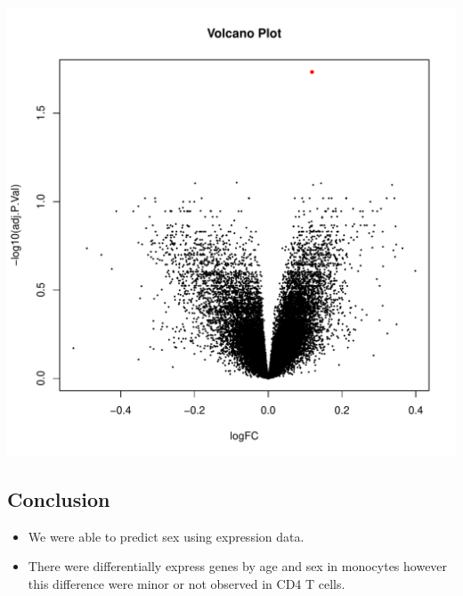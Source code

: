 \documentclass[]{article}
\providecommand{\tightlist}{%
  \setlength{\itemsep}{0pt}\setlength{\parskip}{0pt}}
\begin{document}
\includegraphics{./Vplot.Mod3_Mono_ageCategorical_sex.pdf}

\hypertarget{conclusion}{%
\subsection{Conclusion}\label{conclusion}}

\begin{itemize}
\tightlist
\item
  We were able to predict sex using expression data.
\item
  There were differentially express genes by age and sex in monocytes
  however this difference were minor or not observed in CD4 T cells.
\end{itemize}
\end{document}
